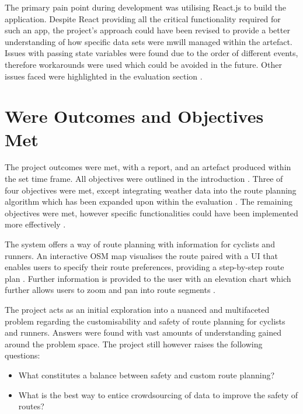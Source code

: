 The primary pain point during development was utilising React.js to build the application. Despite React providing all the critical functionality required for such an app, the project's approach could have been revised to provide a better understanding of how specific data sets were mwill managed within the artefact. Issues with passing state variables were found due to the order of different events, therefore workarounds were used which could be avoided in the future. Other issues faced were highlighted in the evaluation section .

\label{reflection-and-conclusion:outcomes/objectives-met}
\section{Were Outcomes and Objectives Met}

The project outcomes were met, with a report, and an artefact produced within the set time frame. All objectives were outlined in the introduction . Three of four objectives were met, except integrating weather data into the route planning algorithm which has been expanded upon within the evaluation . The remaining objectives were met, however specific functionalities could have been implemented more effectively .

The system offers a way of route planning with information for cyclists and runners. An interactive OSM map visualises the route paired with a UI that enables users to specify their route preferences, providing a step-by-step route plan . Further information is provided to the user with an elevation chart which further allows users to zoom and pan into route segments .

The project acts as an initial exploration into a nuanced and multifaceted problem regarding the customisability and safety of route planning for cyclists and runners. Answers were found with vast amounts of understanding gained around the problem space. The project still however raises the following questions:
\begin{itemize}
    \item What constitutes a balance between safety and custom route planning?
    \item What is the best way to entice crowdsourcing of data to improve the safety of routes?
\end{itemize}

